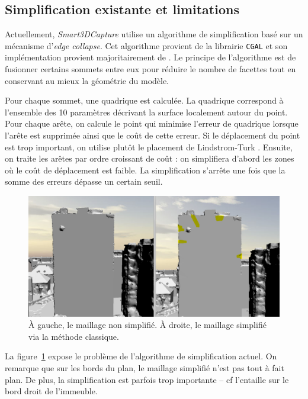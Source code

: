 ﻿\documentclass[12pt, twoside]{article}
\begin{document}
\subsection{Simplification existante et limitations}
Actuellement, \textit{Smart3DCapture} utilise un algorithme de simplification basé sur un mécanisme d'\textit{edge collapse}. Cet algorithme provient de la librairie \texttt{CGAL} et son implémentation provient majoritairement de \cite{simp1, simp2}. Le principe de l'algorithme est de fusionner certains sommets entre eux pour réduire le nombre de facettes tout en conservant au mieux la géométrie du modèle.

Pour chaque sommet, une quadrique est calculée. La quadrique correspond à l'ensemble des 10 paramètres décrivant la surface localement autour du point. Pour chaque arête, on calcule le point qui minimise l'erreur de quadrique lorsque l'arête est supprimée ainsi que le coût de cette erreur. Si le déplacement du point est trop important, on utilise plutôt le placement de Lindstrom-Turk \cite{simp2}. Ensuite, on traite les arêtes par ordre croissant de coût : on simplifiera d'abord les zones où le coût de déplacement est faible. La simplification s'arrête une fois que la somme des erreurs dépasse un certain seuil.

\begin{figure}[h]
\centering
\includegraphics[scale=0.33]{Simpli1.png}
\caption{\label{fig:simpl1} À gauche, le maillage non simplifié. À droite, le maillage simplifié via la méthode classique.}
\end{figure}

La figure~\ref{fig:simpl1} expose le problème de l'algorithme de simplification actuel. On remarque que sur les bords du plan, le maillage simplifié n'est pas tout à fait plan. De plus, la simplification est parfois trop importante -- cf l'entaille sur le bord droit de l'immeuble.
\end{document}
